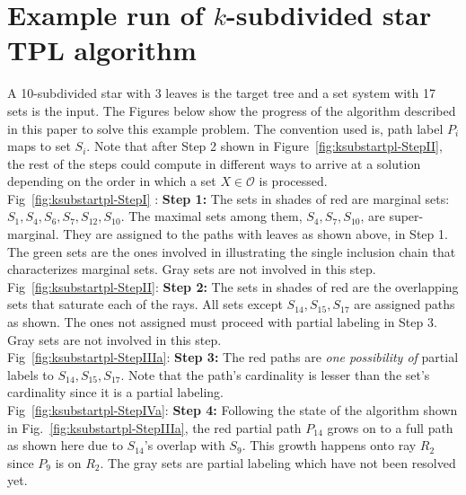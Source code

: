 \documentclass[envcountsect, envcountsame, 11pt]{../lib/llncs2e/llncs}
\begin{document}


\appendix

\section{Example run of $k$-subdivided star TPL algorithm}

A 10-subdivided star with 3 leaves is the target tree and a set system
with 17 sets is the input. The Figures below show the progress of the
algorithm described in this paper to solve this example problem. The
convention used is, path label $P_i$ maps to set $S_i$. Note that
after Step 2 shown in Figure~\ref{fig:ksubstartpl-StepII}, the rest of
the steps could compute in different ways to arrive at a solution
depending on the order in which a set $X \in \mathcal{O}$ is processed.\\



\noindent
Fig~\ref{fig:ksubstartpl-StepI} : \textbf{Step 1:} The sets in shades
of red are marginal sets: $S_1, S_4, S_6, S_7, S_{12}, S_{10}$. The
maximal sets among them, $S_4, S_7, S_{10}$, are super-marginal. They
are assigned to the paths with leaves as shown above, in Step 1. The
green sets are the ones involved in illustrating the single inclusion
chain that characterizes marginal sets. Gray sets are not involved in
this step. \\

\noindent
Fig~\ref{fig:ksubstartpl-StepII}: \textbf{Step 2:} The sets in shades
of red are the overlapping sets that saturate each of the rays. All
sets except $S_{14}, S_{15}, S_{17}$ are assigned paths as shown. The
ones not assigned must proceed with partial labeling in Step 3. Gray
sets are not involved in this step. \\

\noindent
Fig~\ref{fig:ksubstartpl-StepIIIa}: \textbf{Step 3:} The red paths are
{\em one possibility of} partial labels to $S_{14}, S_{15},
S_{17}$. Note that the path's cardinality is lesser than the set's
cardinality since it is a partial labeling. \\

\noindent
Fig~\ref{fig:ksubstartpl-StepIVa}: \textbf{Step 4:} Following the
state of the algorithm shown in Fig.~\ref{fig:ksubstartpl-StepIIIa},
the red partial path $P_{14}$ grows on to a full path as shown here
due to $S_{14}$'s overlap with $S_9$. This growth happens onto ray
$R_2$ since $P_9$ is on $R_2$. The gray sets are partial labeling
which have not been resolved yet. \\
\end{document}
